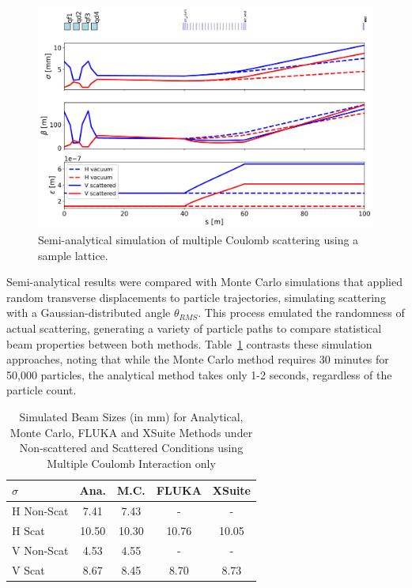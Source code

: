 \documentclass[a4paper,
               biblatex,     %
               ]{jacow}
\begin{document}
\begin{figure}[!htb]
   \centering
   \includegraphics*[width=1.0\columnwidth]{THPR30_f2.png}
   \caption{Semi-analytical simulation of multiple Coulomb scattering using a sample lattice.}
   \label{fig:simple_line}
\end{figure}

Semi-analytical results were compared with Monte Carlo simulations that applied random transverse displacements to particle trajectories, simulating scattering with a Gaussian-distributed angle $\theta_{RMS}$. This process emulated the randomness of actual scattering, generating a variety of particle paths to compare statistical beam properties between both methods. Table~\ref{tab:sigma_comparison} contrasts these simulation approaches, noting that while the Monte Carlo method requires 30 minutes for 50,000 particles, the analytical method takes only 1-2 seconds, regardless of the particle count. 

\begin{table}[ht]
\centering
\caption{Simulated Beam Sizes (in mm) for Analytical, Monte Carlo, FLUKA and XSuite \cite{iadarola:hb2023-tua2i1} Methods under Non-scattered and Scattered Conditions using Multiple Coulomb Interaction only}
\begin{tabular}{lcccc}
\hline
$\sigma$ & Ana. & M.C. & FLUKA & XSuite \\
\hline
H Non-Scat & 7.41 & 7.43 & - & -\\
H Scat & 10.50 & 10.30 & 10.76 & 10.05 \\
V Non-Scat & 4.53 & 4.55 & - & -\\
V Scat & 8.67 & 8.45 & 8.70 & 8.73 \\
\hline
\end{tabular}
\label{tab:sigma_comparison}
\end{table}
\end{document}
